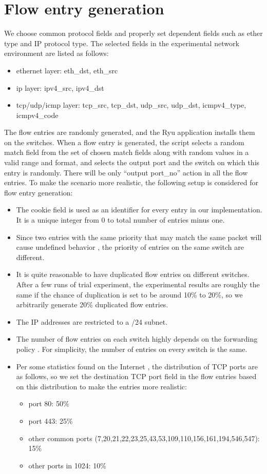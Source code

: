 \section{Flow entry generation}
\label{flow_entry_generation}
We choose common protocol fields and properly set dependent fields such as ether type and IP protocol type. The selected fields in the experimental network environment are listed as follows:

\begin{itemize}
\item
ethernet layer: eth\_dst, eth\_src
\item
ip layer: ipv4\_src, ipv4\_dst
\item
tcp/udp/icmp layer: tcp\_src, tcp\_dst, udp\_src, udp\_dst, icmpv4\_type, icmpv4\_code
\end{itemize}

The flow entries are randomly generated, and the Ryu application installs them on the switches. When a flow entry is generated, the script selects a random match field from the set of chosen match fields along with random values in a valid range and format, and selects the output port and the switch on which this entry is randomly. There will be only ``output port\_no'' action in all the flow entries. To make the scenario more realistic, the following setup is considered for flow entry generation:

\begin{itemize}
\item 
The cookie field is used as an identifier for every entry in our implementation. It is a unique integer from 0 to total number of entries minus one.
\item
Since two entries with the same priority that may match the same packet will cause undefined behavior \cite{OF_SPEC}, the priority of entries on the same switch are different.
\item
It is quite reasonable to have duplicated flow entries on different switches. After a few runs of trial experiment, the experimental results are roughly the same if the chance of duplication is set to be around 10\% to 20\%, so we arbitrarily generate 20\% duplicated flow entries. 
\item
The IP addresses are restricted to a /24 subnet.
\item
The number of flow entries on each switch highly depends on the forwarding policy \cite{MPFHMRSV09}. For simplicity, the number of entries on every switch is the same. 
\item
Per some statistics found on the Internet \cite{PORT_FREQ}, the distribution of TCP ports are as follows, so we set the destination TCP port field in the flow entries based on this distribution to make the entries more realistic:
\begin{itemize}
\item
port 80: 50\%
\item
port 443: 25\%
\item
other common ports (7,20,21,22,23,25,43,53,109,110,156,161,194,546,547): 15\%
\item
other ports in 1024: 10\%
\end{itemize}
\end{itemize}


